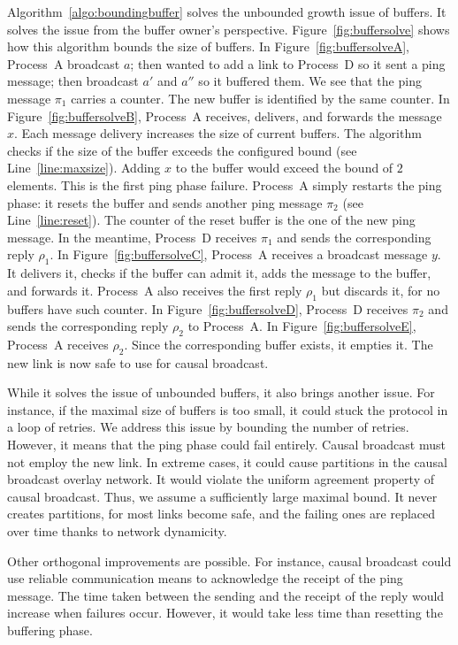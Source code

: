 Algorithm~\ref{algo:boundingbuffer} solves the unbounded growth issue of
buffers. It solves the issue from the buffer owner's
perspective. Figure~\ref{fig:buffersolve} shows how this algorithm bounds the
size of buffers. In Figure~\ref{fig:buffersolveA}, Process~A broadcast $a$; then
wanted to add a link to Process~D so it sent a ping message; then broadcast $a'$
and $a''$ so it buffered them. We see that the ping message $\pi_1$ carries a
counter. The new buffer is identified by the same counter. In
Figure~\ref{fig:buffersolveB}, Process~A receives, delivers, and forwards the
message $x$. Each message delivery increases the size of current buffers. The
algorithm checks if the size of the buffer exceeds the configured bound (see
Line~\ref{line:maxsize}). Adding $x$ to the buffer would exceed the bound of $2$
elements. This is the first ping phase failure. Process~A simply restarts the
ping phase: it resets the buffer and sends another ping message $\pi_2$ (see
Line~\ref{line:reset}). The counter of the reset buffer is the one of the new
ping message. In the meantime, Process~D receives $\pi_1$ and sends the
corresponding reply $\rho_1$. In Figure~\ref{fig:buffersolveC}, Process~A
receives a broadcast message $y$. It delivers it, checks if the buffer can admit
it, adds the message to the buffer, and forwards it. Process~A also receives the
first reply $\rho_1$ but discards it, for no buffers have such counter. In
Figure~\ref{fig:buffersolveD}, Process~D receives $\pi_2$ and sends the
corresponding reply $\rho_2$ to Process~A. In Figure~\ref{fig:buffersolveE},
Process~A receives $\rho_2$. Since the corresponding buffer exists, it empties
it. The new link is now safe to use for causal broadcast.

While it solves the issue of unbounded buffers, it also brings another
issue. For instance, if the maximal size of buffers is too small, it could stuck
the protocol in a loop of retries. We address this issue by bounding the number
of retries. However, it means that the ping phase could fail
entirely. Causal broadcast must not employ the new link. In extreme cases, it
could cause partitions in the causal broadcast overlay network. It would violate
the uniform agreement property of causal broadcast. Thus, we assume a
sufficiently large maximal bound. It never creates partitions, for most links
become safe, and the failing ones are replaced over time thanks to
network dynamicity.

Other orthogonal improvements are possible. For instance, causal broadcast could
use reliable communication means to acknowledge the receipt of the ping
message. The time taken between the sending and the receipt of the
reply would increase when failures occur. However, it would take less
time than resetting the buffering phase.


